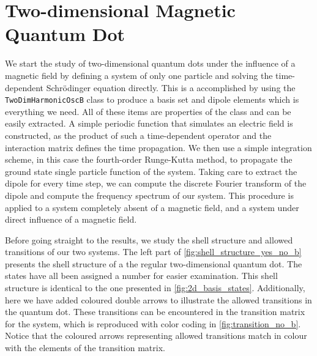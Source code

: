 \section{Two-dimensional Magnetic Quantum Dot}

We start the study of two-dimensional quantum dots under the influence of a magnetic 
field by defining a system of only one particle and solving the time-dependent 
Schrödinger equation
directly. This is a accomplished by using the \lstinline{TwoDimHarmonicOscB} class
to produce a basis set and dipole elements
which is everything we need. All of these items are properties of the class and can be
easily extracted. A simple periodic function that simulates an electric field is constructed, as 
the product of such a time-dependent operator and the interaction matrix defines the 
time propagation. We then use a simple integration scheme, in this case the fourth-order 
Runge-Kutta method, to propagate the ground state single particle function of the system.
Taking care to extract the dipole for every time step, we can compute the discrete Fourier 
transform of the dipole and compute the frequency spectrum of our system. This procedure is 
applied to a system completely absent of a magnetic field, and a system under direct influence 
of a magnetic field.

Before going straight to the results, we study the shell structure and allowed transitions of 
our two systems. The left part of \autoref{fig:shell_structure_yes_no_b} presents the 
shell structure of a the regular two-dimensional quantum dot. The states have all been assigned
a number for easier examination. This shell structure is 
identical to the one presented in \autoref{fig:2d_basis_states}. Additionally, here we have added
coloured double arrows to illustrate the allowed transitions in the quantum dot. These 
transitions can be encountered in the transition matrix for the system, which is
reproduced with color coding in \autoref{fig:transition_no_b}. Notice that the coloured 
arrows representing allowed transitions match in colour with the elements of the transition 
matrix.

